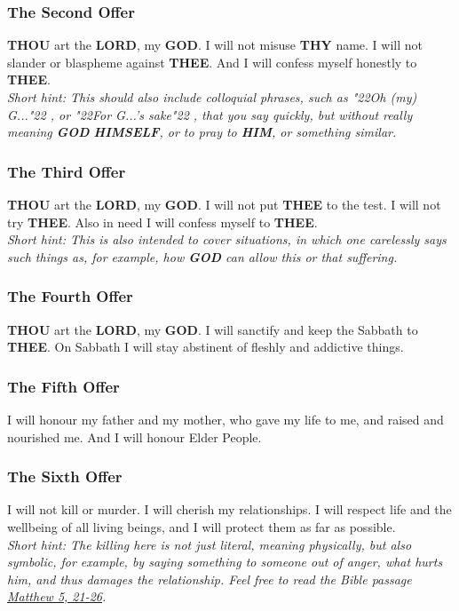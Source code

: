 \documentclass[10pt,a5paper]{article}
\newcommand{\God}[0]{\textbf{GOD}}
\newcommand{\Him}[0]{\textbf{HIM}}
\newcommand{\Himself}[0]{\textbf{HIMSELF}}
\newcommand{\Lord}[0]{\textbf{LORD}}
\newcommand{\Thee}[0]{\textbf{THEE}}
\newcommand{\Thou}[0]{\textbf{THOU}}
\newcommand{\Thy}[0]{\textbf{THY}}
\newcommand{\q}[1]{\char"22{#1}\char"22 }
\begin{document}
	\subsubsection{The Second Offer}
		{\Thou} art the {\Lord},
		my {\God}.
		I will not misuse {\Thy} name.
		I will not slander or blaspheme against {\Thee}.
		And I will confess myself honestly to {\Thee}.
		\\
		\textit{Short hint:
		This should also include colloquial phrases,
		such as \q{Oh (my) G...},
		or \q{For G...'s sake},
		that you say quickly,
		but without really meaning {\God} {\Himself},
		or to pray to {\Him},
		or something similar.}
			
	\subsubsection{The Third Offer}
		{\Thou} art the {\Lord},
		my {\God}.
		I will not put {\Thee} to the test.
		I will not try {\Thee}.
		Also in need I will confess myself to {\Thee}.
		\\
		\textit{Short hint:
		This is also intended to cover situations,
		in which one carelessly says such things as,
		for example,
		how {\God} can allow this or that suffering.}
		
	\subsubsection{The Fourth Offer}
		{\Thou} art the {\Lord},
		my {\God}.
		I will sanctify and keep the Sabbath to {\Thee}.
		On Sabbath I will stay abstinent of fleshly
		and addictive things.
		
	\subsubsection{The Fifth Offer}
		I will honour my father and my mother,
		who gave my life to me,
		and raised and nourished me.
		And I will honour Elder People.
			
	\subsubsection{The Sixth Offer} \label{TheSixthOffer}
		I will not kill or murder.
		I will cherish my relationships.
		I will respect life and the wellbeing of all living beings,
		and I will protect them as far as possible.
		\\
		\textit{Short hint:
		The killing here is not just literal,
		meaning physically,
		but also symbolic,
		for example,
		by saying something to someone out of anger,
		what hurts him,
		and thus damages the relationship.
		Feel free to read the Bible passage \href{https://www.die-bibel.de/bibeln/online-bibeln/lesen/ESV/MAT.5/Matthew-5}{Matthew 5, 21-26}.}
		
\end{document}
